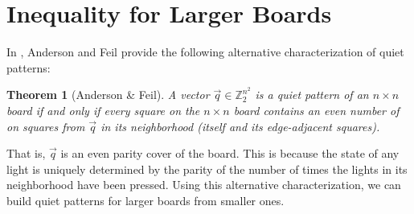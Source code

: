 \documentclass[a4paper]{article}
\newtheorem{theorem}{Theorem}
\newcommand{\Z}{\mathbb{Z}}
\begin{document}
	\section{Inequality for Larger Boards}
	In \cite{anderson_feil}, Anderson and Feil provide the following alternative characterization of quiet patterns:
	
	\begin{theorem}[Anderson \& Feil]\label{alt-characterization-quiet-patterns}
		A vector $\vec{q} \in \Z^{n^2}_2$ is a quiet pattern of an $n \times n$ board if and only if every square on the $n \times n$ board contains an even number of on squares from $\vec{q}$ in its neighborhood (itself and its edge-adjacent squares).
	\end{theorem}
	That is, $\vec{q}$ is an even parity cover of the board.
	This is because the state of any light is uniquely determined by the parity of the number of times the lights in its neighborhood have been pressed. Using this alternative characterization, we can build quiet patterns for larger boards from smaller ones.
	
\end{document}
